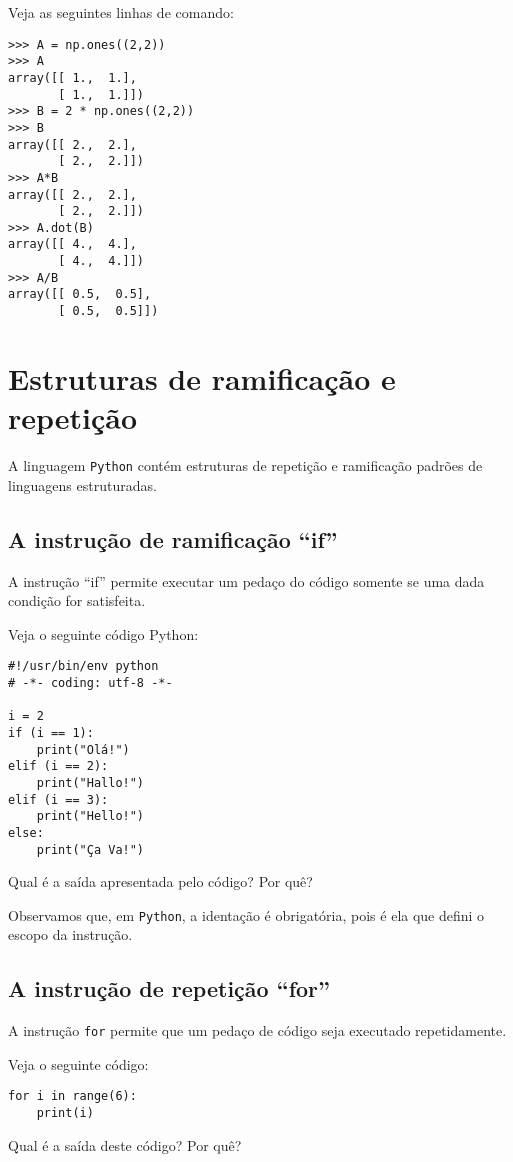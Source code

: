 \begin{ex}
  Veja as seguintes linhas de comando:
\begin{verbatim}
>>> A = np.ones((2,2))
>>> A
array([[ 1.,  1.],
       [ 1.,  1.]])
>>> B = 2 * np.ones((2,2))
>>> B
array([[ 2.,  2.],
       [ 2.,  2.]])
>>> A*B
array([[ 2.,  2.],
       [ 2.,  2.]])
>>> A.dot(B)
array([[ 4.,  4.],
       [ 4.,  4.]])
>>> A/B
array([[ 0.5,  0.5],
       [ 0.5,  0.5]])
\end{verbatim}
\end{ex}

\section{Estruturas de ramificação e repetição}

A linguagem \verb+Python+ contém estruturas de repetição e ramificação padrões de linguagens estruturadas.

\subsection{A instrução de ramificação ``if''}

A instrução ``if'' permite executar um pedaço do código somente se uma dada condição for satisfeita.

\begin{ex}
  Veja o seguinte código Python:
\begin{verbatim}
#!/usr/bin/env python
# -*- coding: utf-8 -*-

i = 2
if (i == 1):
    print("Olá!")
elif (i == 2):
    print("Hallo!")
elif (i == 3):
    print("Hello!")
else:
    print("Ça Va!")
\end{verbatim}
Qual é a saída apresentada pelo código? Por quê?
\end{ex}

Observamos que, em \verb+Python+, a identação é obrigatória, pois é ela que defini o escopo da instrução.

\subsection{A instrução de repetição ``for''}

A instrução \verb+for+ permite que um pedaço de código seja executado repetidamente.

\begin{ex}
  Veja o seguinte código:
\begin{verbatim}
for i in range(6):
    print(i)
\end{verbatim}
Qual é a saída deste código? Por quê?
\end{ex}

